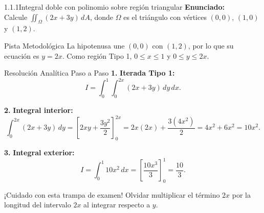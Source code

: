 \documentclass[11pt,a4paper]{article}
\begin{document}
\begin{nivelbox}{1.1.1}{Integral doble con polinomio sobre región triangular}
\textbf{Enunciado:}\\
Calcule $\iint_\Omega (2x + 3y) \, dA$, donde $\Omega$ es el triángulo con vértices $(0,0)$, $(1,0)$ y $(1,2)$.

\begin{observacionbox}{Pista Metodológica}
La hipotenusa une $(0,0)$ con $(1,2)$, por lo que su ecuación es $y = 2x$. Como región Tipo 1, $0 \le x \le 1$ y $0 \le y \le 2x$.
\end{observacionbox}

\begin{ejerciciobox}{Resolución Analítica Paso a Paso}
\smallskip\noindent\textbf{1.} \textbf{Iterada Tipo 1:}
\[I = \int_0^1 \int_0^{2x} (2x + 3y) \, dy \, dx.\]

\smallskip\noindent\textbf{2.} \textbf{Integral interior:}
\[\int_0^{2x} (2x + 3y) \, dy = \left[ 2xy + \frac{3y^2}{2} \right]_0^{2x} = 2x(2x) + \frac{3(4x^2)}{2} = 4x^2 + 6x^2 = 10x^2.\]

\smallskip\noindent\textbf{3.} \textbf{Integral exterior:}
\[I = \int_0^1 10x^2 \, dx = \left[ \frac{10x^3}{3} \right]_0^1 = \frac{10}{3}.\]
\end{ejerciciobox}

\begin{errorbox}{¡Cuidado con esta trampa de examen!}
Olvidar multiplicar el término $2x$ por la longitud del intervalo $2x$ al integrar respecto a $y$.
\end{errorbox}
\end{nivelbox}
\bigskip
\end{document}
